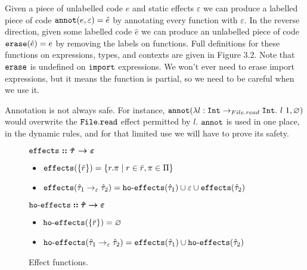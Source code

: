 \noindent
Given a piece of unlabelled code $e$ and static effects $\varepsilon$ we can produce a labelled piece of code $\mathtt{annot}(e, \varepsilon) = \hat e$ by annotating every function with $\varepsilon$. In the reverse direction, given some labelled code $\hat e$ we can produce an unlabelled piece of code $\mathtt{erase}(\hat e) = e$ by removing the labels on functions. Full definitions for these functions on expressions, types, and contexts are given in Figure 3.2. Note that $\mathtt{erase}$ is undefined on $\mathtt{import}$ expressions. We won't ever need to erase import expressions, but it means the function is partial, so we need to be careful when we use it.

Annotation is not always safe. For instance, $\mathtt{annot}(\lambda l: \mathtt{Int} \rightarrow_{File.read} \mathtt{Int} . ~l~1, \varnothing)$ would overwrite the $\mathtt{File.read}$ effect permitted by $l$. $\mathtt{annot}$ is used in one place, in the dynamic rules, and for that limited use we will have to prove its safety. \\













\begin{figure}[h]

$\bm{\mathtt{effects :: \hat \tau \rightarrow \varepsilon}}$ \begin{itemize}
	\setlength\itemsep{-0.7em}
	\item[] $\mathtt{effects}(\{ \bar r \}) = \{ r.\pi \mid r \in \bar r, \pi \in \Pi \}$
	\item[] $\mathtt{effects}(\hat \tau_1 \rightarrow_{\varepsilon} \hat \tau_2) = \mathtt{ho \hbox{-} effects}(\hat \tau_1) \cup \varepsilon \cup \mathtt{effects}(\hat \tau_2)$
\end{itemize}

$\bm{\mathtt{ho \hbox{-} effects} :: \hat \tau \rightarrow \varepsilon}$ \begin{itemize}
	\setlength\itemsep{-0.7em}
	\item[] $\mathtt{ho \hbox{-} effects}(\{ \bar r \}) = \varnothing$
	\item[] $\mathtt{ho \hbox{-} effects}(\hat \tau_1 \rightarrow_{\varepsilon} \hat \tau_2) = \mathtt{effects}(\hat \tau_1) \cup \mathtt{ho \hbox{-} effects}(\hat \tau_2)$
\end{itemize}

\vspace{-7pt}
\caption{Effect functions.}
\label{This is the label.}
\end{figure}

